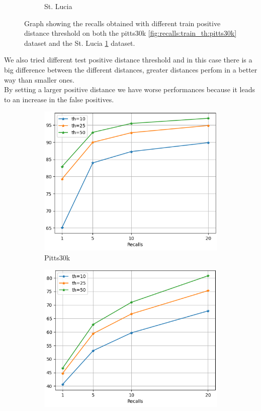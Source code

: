 \documentclass[10pt,twocolumn,letterpaper]{article}
\begin{document}
\begin{figure}[!h]
\begin{subfigure}[b]{0.23\textwidth}
			\caption{St. Lucia}
			\label{fig:recalls:train_th:st_lucia}
		\end{subfigure}
		\caption{Graph showing the recalls obtained with different train positive distance threshold on both the pitts30k \ref{fig:recalls:train_th:pitts30k} dataset and the St. Lucia \ref{fig:recalls:train_th:st_lucia} dataset.}
		\label{fig:recalls:train_th}
	\end{figure}
	We also tried different test positive distance threshold and in this case there is a big difference between the different distances, greater distances perfom in a better way than smaller ones.\\
	By setting a larger positive distance we have worse performances because it leads to an increase in the false positives.
	\begin{figure}[!h]
		\centering
		\begin{subfigure}[b]{0.23\textwidth}
			\centering
			\includegraphics[width=\textwidth]{img/test_th/test_pitts30k_recalls_graph.png}
			\caption{Pitts30k}
			\label{fig:recalls:test_th:pitts30k}
		\end{subfigure}
		\hfill
		\begin{subfigure}[b]{0.23\textwidth}
			\centering
			\includegraphics[width=\textwidth]{img/test_th/test_st_lucia_recalls_graph.png}

\end{subfigure}
\end{figure}
\end{document}
